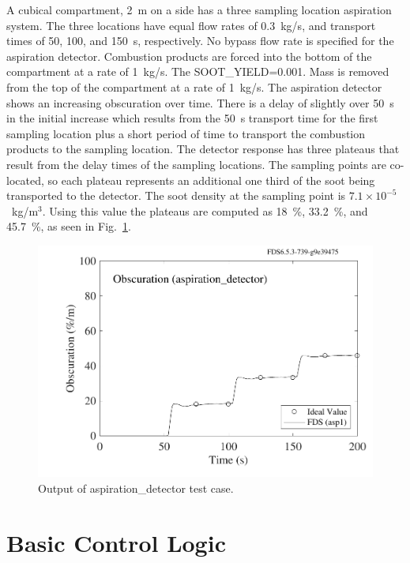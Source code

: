\documentclass[11pt]{book}
\begin{document}
A cubical compartment, 2~m on a side has a three
sampling location aspiration system.  The three locations
have equal flow rates of 0.3~kg/s, and
transport times of 50, 100, and 150~s, respectively.  No bypass flow rate is
specified for the aspiration detector.  Combustion products are forced into the bottom of the compartment at a rate of 1~kg/s. The {\ct SOOT\_YIELD=0.001}.
Mass is removed from the top of the compartment at a rate of 1~kg/s.
The aspiration detector shows an increasing obscuration over time.  There is a delay of slightly over 50~s in
the initial increase which results from the 50~s transport time for the first sampling location plus a short
period of time to transport the combustion products to the sampling location.  The detector response has three plateaus
that result from the delay times of the sampling locations.  The sampling points are co-located, so each plateau represents
an additional one third of the soot being transported to the detector.  The soot density at the sampling point is
$7.1 \times 10^{-5}$~kg/m$^3$.  Using this value the plateaus are computed as 18~\%, 33.2~\%, and 45.7~\%, as seen
in Fig.~\ref{aspiration_detector}.

\begin{figure}[ht]
\begin{center}
\includegraphics[width=4.in]{SCRIPT_FIGURES/aspiration_detector}
\end{center}
\caption[Results of the {\ct aspiration\_detector} test case]{Output of {\ct aspiration\_detector} test case.}
\label{aspiration_detector}
\end{figure}







\section{Basic Control Logic}
\label{info:basic_control}
\end{document}
